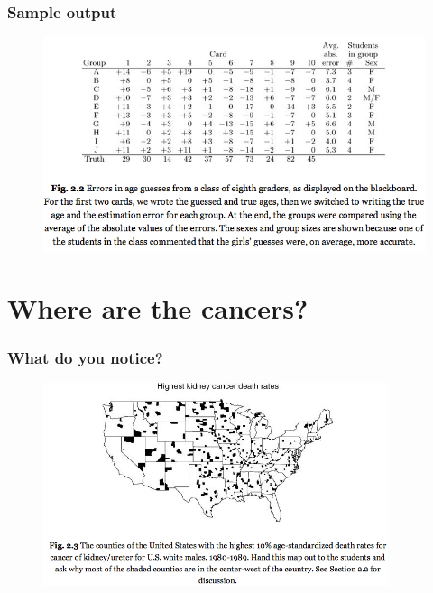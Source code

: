 \documentclass[compress,handout,10pt]{beamer}
\begin{document}
\begin{frame}
    \frametitle{Sample output}
    \vspace{7pt}
    \begin{figure}
        \begin{center}
            \includegraphics[width=\textwidth]{images/guessing-ages-error.png}
        \end{center}
    \end{figure}
\end{frame}

\section{Where are the cancers?}

\begin{frame}
    \frametitle{What do you notice?}
    \vspace{7pt}
    \begin{figure}
        \begin{center}
            \includegraphics[width=0.9\textwidth]{images/HighestKidneyCancerDeathRate.png}
        \end{center}
    \end{figure}
\end{frame}
\end{document}
